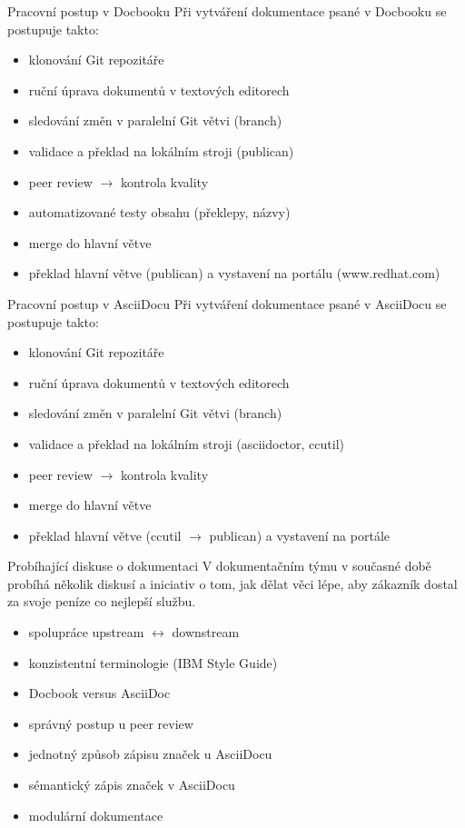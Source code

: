 \documentclass[12pt,a4paper]{beamer}
\begin{document}
	\begin{frame}{Pracovní postup v Docbooku}
	Při vytváření dokumentace psané v Docbooku se postupuje takto:

	\begin{itemize}
		\item klonování Git repozitáře
		\item ruční úprava dokumentů v textových editorech
		\item sledování změn v paralelní Git větvi (branch)
		\item validace a překlad na lokálním stroji (publican)
		\item peer review $\longrightarrow$ kontrola kvality
		\item automatizované testy obsahu (překlepy, názvy)
		\item merge do hlavní větve
		\item překlad hlavní větve (publican) a vystavení na portálu (www.redhat.com)
	\end{itemize}
	\end{frame}

	\begin{frame}{Pracovní postup v AsciiDocu}
	Při vytváření dokumentace psané v AsciiDocu se postupuje takto:

	\begin{itemize}
		\item klonování Git repozitáře
		\item ruční úprava dokumentů v textových editorech
		\item sledování změn v paralelní Git větvi (branch)
		\item validace a překlad na lokálním stroji (asciidoctor, ccutil)
		\item peer review $\longrightarrow$ kontrola kvality
		\item merge do hlavní větve
		\item překlad hlavní větve (ccutil $\longrightarrow$ publican) a vystavení na portále
	\end{itemize}
	\end{frame}

	\begin{frame}{Probíhající diskuse o dokumentaci}
	V dokumentačním týmu v současné době probíhá několik diskusí a iniciativ o tom, jak dělat věci lépe, aby zákazník dostal za svoje peníze co nejlepší službu. 
	
	\begin{itemize}
		\item spolupráce upstream $\longleftrightarrow$ downstream
		\item konzistentní terminologie (IBM Style Guide)
		\item Docbook versus AsciiDoc
		\item správný postup u peer review
		\item jednotný způsob zápisu značek u AsciiDocu
		\item sémantický zápis značek v AsciiDocu
		\item modulární dokumentace
	\end{itemize}
	\end{frame}
\end{document}
